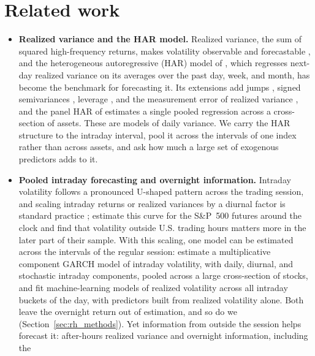 
\section{Related work}
\label{sec:rh_related}
\begin{itemize}
\item \textbf{Realized variance and the HAR model.} Realized variance, the sum of squared high-frequency returns,
  makes volatility observable and forecastable \citep{AndersenBollerslevDieboldLabys2003,
  BarndorffNielsenShephard2002}, and the heterogeneous autoregressive (HAR) model of \citet{Corsi2009}, which
  regresses next-day realized variance on its averages over the past day, week, and month, has become the benchmark
  for forecasting it. Its extensions add jumps \citep{AndersenBollerslevDiebold2007}, signed semivariances
  \citep{PattonSheppard2015}, leverage \citep{CorsiReno2012}, and the measurement error of realized variance
  \citep{BollerslevPattonQuaedvlieg2016}, and the panel HAR of \citet{BollerslevHoodHussLebedev2018} estimates a
  single pooled regression across a cross-section of assets. These are models of daily variance. We carry the HAR
  structure to the intraday interval, pool it across the intervals of one index rather than across assets, and ask
  how much a large set of exogenous predictors adds to it.
\item \textbf{Pooled intraday forecasting and overnight information.} Intraday volatility follows a pronounced
  U-shaped pattern across the trading session, and scaling intraday returns or realized variances by a diurnal
  factor is standard practice \citep{AndersenBollerslev1997,TaylorXu1997}; \citet{AndersenSuTodorovZhang2024}
  estimate this curve for the S\&P~500 futures around the clock and find that volatility outside U.S. trading hours
  matters more in the later part of their sample. With this scaling, one model can be estimated across the intervals
  of the regular session: \citet{EngleSokalska2012} estimate a multiplicative component GARCH model of intraday
  volatility, with daily, diurnal, and stochastic intraday components, pooled across a large cross-section of
  stocks, and \citet{ZhangZhangCucuringuQian2024} fit machine-learning models of realized volatility across all
  intraday buckets of the day, with predictors built from realized volatility alone. Both leave the overnight return
  out of estimation, and so do we (Section~\ref{sec:rh_methods}). Yet information from outside the session helps
  forecast it: after-hours realized variance \citep{ChenYuZivot2012} and overnight information, including the

\end{itemize}
